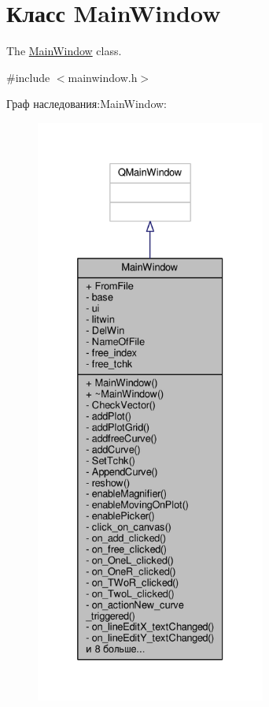 \hypertarget{class_main_window}{}\section{Класс Main\+Window}
\label{class_main_window}


The \hyperlink{class_main_window}{Main\+Window} class.  




{\ttfamily \#include $<$mainwindow.\+h$>$}



Граф наследования\+:Main\+Window\+:\nopagebreak
\begin{figure}[H]
\begin{center}
\leavevmode
\includegraphics[height=550pt]{class_main_window__inherit__graph}
\end{center}
\end{figure}


